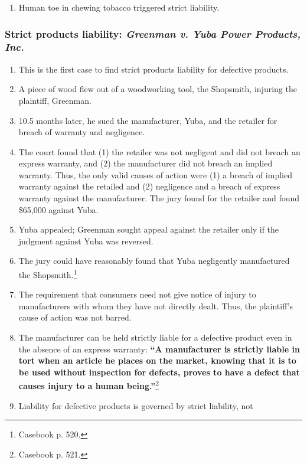 \begin{enumerate}
    \item Human toe in chewing tobacco triggered strict liability.
\end{enumerate}

\subsubsection{Strict products liability: \emph{Greenman v. Yuba Power Products, 
Inc.}}

\begin{enumerate}
    \item This is the first case to find strict products liability for defective 
    products.
    \item A piece of wood flew out of a woodworking tool, the Shopsmith, 
    injuring the plaintiff, Greenman.
    \item 10.5 months later, he sued the manufacturer, Yuba, and the retailer 
    for breach of warranty and negligence.
    \item The court found that (1) the retailer was not negligent and did not 
    breach an express warranty, and (2) the manufacturer did not breach an 
    implied warranty. Thus, the only valid causes of action were (1) a breach of 
    implied warranty against the retailed and (2) negligence and a breach of 
    express warranty against the manufacturer. The jury found for the retailer 
    and found \$65,000 against Yuba.
    \item Yuba appealed; Greenman sought appeal against the retailer only if the 
    judgment against Yuba was reversed.
    \item The jury could have reasonably found that Yuba negligently 
    manufactured the Shopsmith.\footnote{Casebook p. 520.}
    \item The requirement that consumers need not give notice of injury to 
    manufacturers with whom they have not directly dealt. Thus, the plaintiff's 
    cause of action was not barred.
    \item The manufacturer can be held strictly liable for a defective product 
    even in the absence of an express warranty: \textbf{``A manufacturer is 
    strictly liable in tort when an article he places on the market, knowing 
    that it is to be used without inspection for defects, proves to have a 
    defect that causes injury to a human being.''}\footnote{Casebook p. 521.}
    \item Liability for defective products is governed by strict liability, not 

\end{enumerate}
